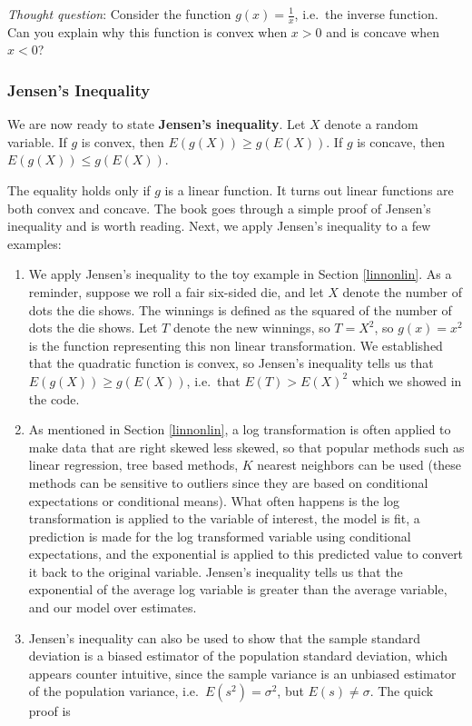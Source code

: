 \documentclass[
]{book}
\begin{document}
\emph{Thought question}: Consider the function \(g(x) = \frac{1}{x}\), i.e.~the inverse function. Can you explain why this function is convex when \(x>0\) and is concave when \(x<0\)?

\hypertarget{jensens-inequality-1}{%
\subsubsection{Jensen's Inequality}\label{jensens-inequality-1}}

We are now ready to state \textbf{Jensen's inequality}. Let \(X\) denote a random variable. If \(g\) is convex, then \(E(g(X)) \geq g(E(X))\). If \(g\) is concave, then \(E(g(X)) \leq g(E(X))\).

The equality holds only if \(g\) is a linear function. It turns out linear functions are both convex and concave. The book goes through a simple proof of Jensen's inequality and is worth reading. Next, we apply Jensen's inequality to a few examples:

\begin{enumerate}
\def\labelenumi{\arabic{enumi}.}
\item
  We apply Jensen's inequality to the toy example in Section \ref{linnonlin}. As a reminder, suppose we roll a fair six-sided die, and let \(X\) denote the number of dots the die shows. The winnings is defined as the squared of the number of dots the die shows. Let \(T\) denote the new winnings, so \(T = X^2\), so \(g(x) = x^2\) is the function representing this non linear transformation. We established that the quadratic function is convex, so Jensen's inequality tells us that \(E(g(X)) \geq g(E(X))\), i.e.~that \(E(T) > E(X)^2\) which we showed in the code.
\item
  As mentioned in Section \ref{linnonlin}, a log transformation is often applied to make data that are right skewed less skewed, so that popular methods such as linear regression, tree based methods, \(K\) nearest neighbors can be used (these methods can be sensitive to outliers since they are based on conditional expectations or conditional means). What often happens is the log transformation is applied to the variable of interest, the model is fit, a prediction is made for the log transformed variable using conditional expectations, and the exponential is applied to this predicted value to convert it back to the original variable. Jensen's inequality tells us that the exponential of the average log variable is greater than the average variable, and our model over estimates.
\item
  Jensen's inequality can also be used to show that the sample standard deviation is a biased estimator of the population standard deviation, which appears counter intuitive, since the sample variance is an unbiased estimator of the population variance, i.e.~\(E(s^2) = \sigma^2\), but \(E(s) \neq \sigma\). The quick proof is
\end{enumerate}
\end{document}
